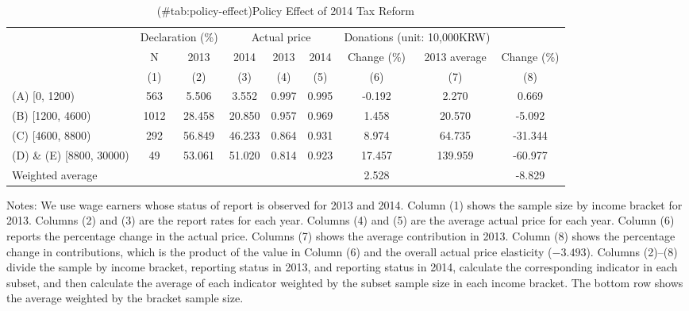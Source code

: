 \begin{table}

\caption{(\#tab:policy-effect)Policy Effect of 2014 Tax Reform}
\centering
\fontsize{8}{10}\selectfont
\begin{threeparttable}
\begin{tabular}[t]{>{\raggedright\arraybackslash}p{10em}cccccccc}
\toprule
\multicolumn{2}{c}{ } & \multicolumn{2}{c}{Declaration (\%)} & \multicolumn{3}{c}{Actual price} & \multicolumn{2}{c}{Donations (unit: 10,000KRW)} \\
\cmidrule(l{3pt}r{3pt}){3-4} \cmidrule(l{3pt}r{3pt}){5-7} \cmidrule(l{3pt}r{3pt}){8-9}
\multicolumn{1}{c}{2013 Income bracket} & \multicolumn{1}{c}{N} & \multicolumn{1}{c}{2013} & \multicolumn{1}{c}{2014} & \multicolumn{1}{c}{2013} & \multicolumn{1}{c}{2014} & \multicolumn{1}{c}{Change (\%)} & \multicolumn{1}{c}{2013 average} & \multicolumn{1}{c}{Change (\%)} \\
\cmidrule(l{3pt}r{3pt}){1-1} \cmidrule(l{3pt}r{3pt}){2-2} \cmidrule(l{3pt}r{3pt}){3-3} \cmidrule(l{3pt}r{3pt}){4-4} \cmidrule(l{3pt}r{3pt}){5-5} \cmidrule(l{3pt}r{3pt}){6-6} \cmidrule(l{3pt}r{3pt}){7-7} \cmidrule(l{3pt}r{3pt}){8-8} \cmidrule(l{3pt}r{3pt}){9-9}
 & (1) & (2) & (3) & (4) & (5) & (6) & (7) & (8)\\
\midrule
(A) [0, 1200) & 563 & 5.506 & 3.552 & 0.997 & 0.995 & -0.192 & 2.270 & 0.669\\
(B) [1200, 4600) & 1012 & 28.458 & 20.850 & 0.957 & 0.969 & 1.458 & 20.570 & -5.092\\
(C) [4600, 8800) & 292 & 56.849 & 46.233 & 0.864 & 0.931 & 8.974 & 64.735 & -31.344\\
(D) \& (E) [8800, 30000) & 49 & 53.061 & 51.020 & 0.814 & 0.923 & 17.457 & 139.959 & -60.977\\
Weighted average &  &  &  &  &  & 2.528 &  & -8.829\\
\bottomrule
\end{tabular}
\begin{tablenotes}
\item Notes: We use wage earners whose status of report is observed for 2013 and 2014. Column (1) shows the sample size by income bracket for 2013. Columns (2) and (3) are the report rates for each year. Columns (4) and (5) are the average actual price for each year. Column (6) reports the percentage change in the actual price. Columns (7) shows the average contribution in 2013. Column (8) shows the percentage change in contributions, which is the product of the value in Column (6) and the overall actual price elasticity ($-3.493$). Columns (2)--(8) divide the sample by income bracket, reporting status in 2013, and reporting status in 2014, calculate the corresponding indicator in each subset, and then calculate the average of each indicator weighted by the subset sample size in each income bracket. The bottom row shows the average weighted by the bracket sample size.
\end{tablenotes}
\end{threeparttable}
\end{table}
